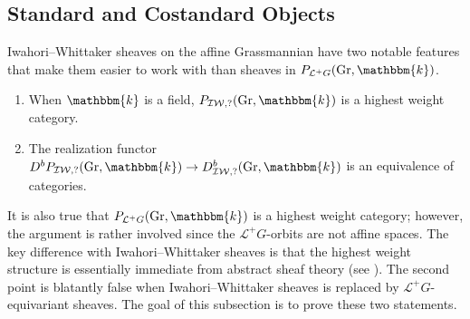 \documentclass{amsart}
\renewcommand{\L}{\mathcal{L}}
\renewcommand{\k}{\mathbbm{k}}
\newcommand{\IW}{\mathcal{IW}}
\DeclareMathOperator{\Gr}{Gr}
\theoremstyle{definition}
\begin{document}
\subsection{Standard and Costandard Objects}

    Iwahori--Whittaker sheaves on the affine Grassmannian have two notable features that make them easier to work with than sheaves in $P_{\L^+ G} (\Gr, \k)$.
    \begin{enumerate}
        \item When $\k$ is a field, $P_{\IW, ?} (\Gr, \k)$ is a highest weight category.
        \item The realization functor $D^b P_{\IW, ?} (\Gr, \k) \to D_{\IW, ?}^b (\Gr, \k)$ is an equivalence of categories.
    \end{enumerate}
    It is also true that $P_{\L^+ G} (\Gr, \k)$ is a highest weight category; however, the argument is rather involved since the $\L^+ G$-orbits are not affine spaces.
    The key difference with Iwahori--Whittaker sheaves is that the highest weight structure is essentially immediate from abstract sheaf theory (see \cite[\S 3.3]{BGS}). 
    The second point is blatantly false when Iwahori--Whittaker sheaves is replaced by $\L^+ G$-equivariant sheaves. 
    The goal of this subsection is to prove these two statements. 
\end{document}
